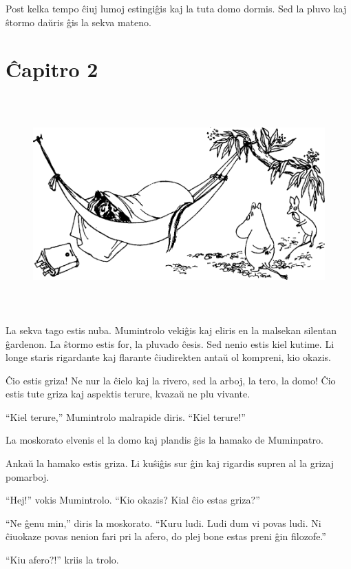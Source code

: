 Post kelka tempo ĉiuj lumoj estingiĝis kaj la tuta domo dormis. Sed la pluvo kaj ŝtormo daŭris ĝis la sekva mateno.

\chapter*[Ĉapitro 2]{Ĉapitro 2}


\begin{figure}[htbp]
\centering
\includegraphics[width=450pt,height=234pt]{2-1.png}
\caption{}
\label{2-1}
\end{figure}

La sekva tago estis nuba. Mumintrolo vekiĝis kaj eliris en la malsekan silentan ĝardenon. La ŝtormo estis for, la pluvado ĉesis. Sed nenio estis kiel kutime. Li longe staris rigardante kaj flarante ĉiudirekten antaŭ ol kompreni, kio okazis.

Ĉio estis griza! Ne nur la ĉielo kaj la rivero, sed la arboj, la tero, la domo! Ĉio estis tute griza kaj aspektis terure, kvazaŭ ne plu vivante.

``Kiel terure,'' Mumintrolo malrapide diris. ``Kiel terure!''

La moskorato elvenis el la domo kaj plandis ĝis la hamako de Muminpatro.

Ankaŭ la hamako estis griza. Li kuŝiĝis sur ĝin kaj rigardis supren al la grizaj pomarboj.

``Hej!'' vokis Mumintrolo. ``Kio okazis? Kial ĉio estas griza?''

``Ne ĝenu min,'' diris la moskorato. ``Kuru ludi. Ludi dum vi povas ludi. Ni ĉiuokaze povas nenion fari pri la afero, do plej bone estas preni ĝin filozofe.''

``Kiu afero?!'' kriis la trolo.

